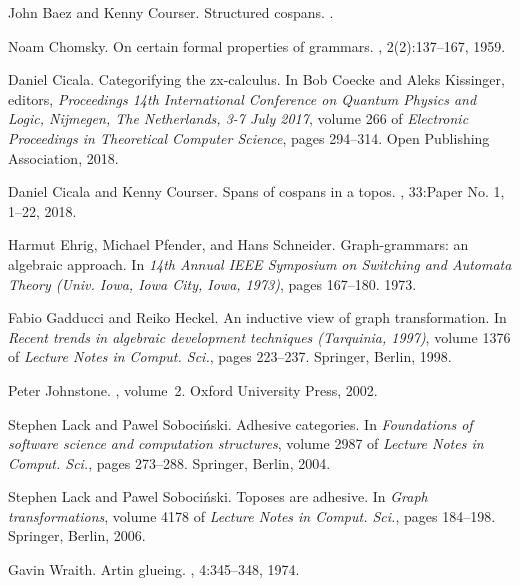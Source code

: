 \documentclass{amsart}
\begin{document}
\begin{thebibliography}{10}

John Baez and Kenny Courser.
\newblock Structured cospans.
.

Noam Chomsky.
\newblock On certain formal properties of grammars.
, 2(2):137--167, 1959.

Daniel Cicala.
\newblock Categorifying the zx-calculus.
\newblock In Bob Coecke and Aleks Kissinger, editors, {\em {\rm Proceedings
  14th International Conference on} Quantum Physics and Logic, {\rm Nijmegen,
  The Netherlands, 3-7 July 2017}}, volume 266 of {\em Electronic Proceedings
  in Theoretical Computer Science}, pages 294--314. Open Publishing
  Association, 2018.

Daniel Cicala and Kenny Courser.
\newblock Spans of cospans in a topos.
, 33:Paper No. 1, 1--22, 2018.

Harmut Ehrig, Michael Pfender, and Hans Schneider.
\newblock Graph-grammars: an algebraic approach.
\newblock In {\em 14th {A}nnual {IEEE} {S}ymposium on {S}witching and
  {A}utomata {T}heory ({U}niv. {I}owa, {I}owa {C}ity, {I}owa, 1973)}, pages
  167--180. 1973.

Fabio Gadducci and Reiko Heckel.
\newblock An inductive view of graph transformation.
\newblock In {\em Recent trends in algebraic development techniques
  ({T}arquinia, 1997)}, volume 1376 of {\em Lecture Notes in Comput. Sci.},
  pages 223--237. Springer, Berlin, 1998.

Peter Johnstone.
, volume~2.
\newblock Oxford University Press, 2002.

Stephen Lack and Pawel Soboci\'{n}ski.
\newblock Adhesive categories.
\newblock In {\em Foundations of software science and computation structures},
  volume 2987 of {\em Lecture Notes in Comput. Sci.}, pages 273--288. Springer,
  Berlin, 2004.

Stephen Lack and Pawel Soboci\'{n}ski.
\newblock Toposes are adhesive.
\newblock In {\em Graph transformations}, volume 4178 of {\em Lecture Notes in
  Comput. Sci.}, pages 184--198. Springer, Berlin, 2006.

Gavin Wraith.
\newblock Artin glueing.
, 4:345--348, 1974.

\end{thebibliography}
\end{document}
